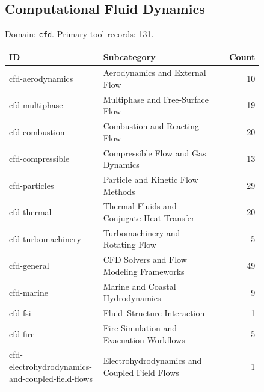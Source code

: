 \subsection{Computational Fluid Dynamics}
\noindent Domain: \texttt{cfd}. Primary tool records: 131.
\begin{longtable}{p{0.37\linewidth}p{0.47\linewidth}r}
ID & Subcategory & Count\\\hline\endhead
cfd-aerodynamics & Aerodynamics and External Flow & 10\\
cfd-multiphase & Multiphase and Free-Surface Flow & 19\\
cfd-combustion & Combustion and Reacting Flow & 20\\
cfd-compressible & Compressible Flow and Gas Dynamics & 13\\
cfd-particles & Particle and Kinetic Flow Methods & 29\\
cfd-thermal & Thermal Fluids and Conjugate Heat Transfer & 20\\
cfd-turbomachinery & Turbomachinery and Rotating Flow & 5\\
cfd-general & CFD Solvers and Flow Modeling Frameworks & 49\\
cfd-marine & Marine and Coastal Hydrodynamics & 9\\
cfd-fsi & Fluid--Structure Interaction & 1\\
cfd-fire & Fire Simulation and Evacuation Workflows & 5\\
cfd-electrohydrodynamics-and-coupled-field-flows & Electrohydrodynamics and Coupled Field Flows & 1\\
\end{longtable}

